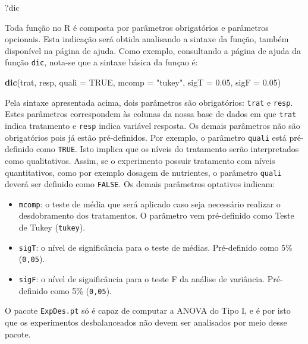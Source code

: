 \documentclass[
]{article}
\newenvironment{Shaded}{\begin{snugshade}}{\end{snugshade}}
\newcommand{\DataTypeTok}[1]{\textcolor[rgb]{0.13,0.29,0.53}{#1}}
\newcommand{\FloatTok}[1]{\textcolor[rgb]{0.00,0.00,0.81}{#1}}
\newcommand{\KeywordTok}[1]{\textcolor[rgb]{0.13,0.29,0.53}{\textbf{#1}}}
\newcommand{\NormalTok}[1]{#1}
\newcommand{\OtherTok}[1]{\textcolor[rgb]{0.56,0.35,0.01}{#1}}
\newcommand{\StringTok}[1]{\textcolor[rgb]{0.31,0.60,0.02}{#1}}
\providecommand{\tightlist}{%
  \setlength{\itemsep}{0pt}\setlength{\parskip}{0pt}}
\begin{document}
\begin{Shaded}
\begin{Highlighting}[]
\NormalTok{?dic}
\end{Highlighting}
\end{Shaded}

Toda função no R é composta por parâmetros obrigatórios e parâmetros opcionais. Esta indicação será obtida analisando a sintaxe da função, também disponível na página de ajuda. Como exemplo, consultando a página de ajuda da função \texttt{dic}, nota-se que a sintaxe básica da funçao é:

\begin{Shaded}
\begin{Highlighting}[]
\KeywordTok{dic}\NormalTok{(trat, resp, }\DataTypeTok{quali =} \OtherTok{TRUE}\NormalTok{, }\DataTypeTok{mcomp =} \StringTok{"tukey"}\NormalTok{, }\DataTypeTok{sigT =} \FloatTok{0.05}\NormalTok{, }\DataTypeTok{sigF =} \FloatTok{0.05}\NormalTok{)}
\end{Highlighting}
\end{Shaded}

Pela sintaxe apresentada acima, dois parâmetros são obrigatórios: \texttt{trat} e \texttt{resp}. Estes parâmetros correspondem às colunas da nossa base de dados em que \texttt{trat} indica tratamento e \texttt{resp} indica variável resposta. Os demais parâmetros não são obrigatórios pois já estão pré-definidos. Por exemplo, o parâmetro \texttt{quali} está pré-definido como \texttt{TRUE}. Isto implica que os níveis do tratamento serão interpretados como qualitativos. Assim, se o experimento possuir tratamento com níveis quantitativos, como por exemplo dosagem de nutrientes, o parâmetro \texttt{quali} deverá ser definido como \texttt{FALSE}. Os demais parâmetros optativos indicam:

\begin{itemize}
\tightlist
\item
  \texttt{mcomp}: o teste de média que será aplicado caso seja necessário realizar o desdobramento dos tratamentos. O parâmetro vem pré-definido como Teste de Tukey (\texttt{tukey}).
\item
  \texttt{sigT}: o nível de significância para o teste de médias. Pré-definido como 5\% (\texttt{0,05}).
\item
  \texttt{sigF}: o nível de significância para o teste F da análise de variância. Pré-definido como 5\% (\texttt{0,05}).
\end{itemize}

O pacote \texttt{ExpDes.pt} só é capaz de computar a ANOVA do Tipo I, e é por isto que os experimentos desbalanceados não devem ser analisados por meio desse pacote.
\end{document}
